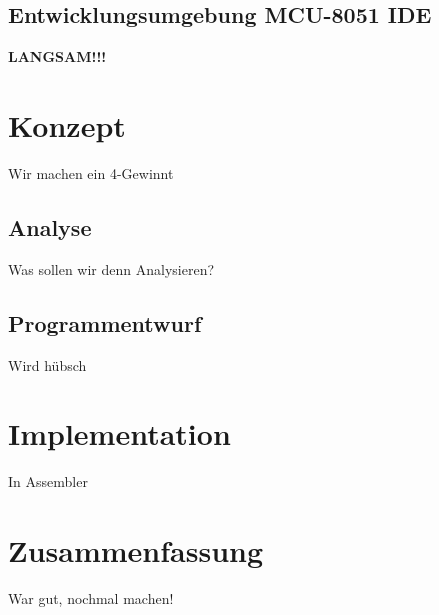 \section{Entwicklungsumgebung MCU-8051 IDE}

\textbf{LANGSAM!!!}

\chapter{Konzept}

Wir machen ein 4-Gewinnt

\section{Analyse}

Was sollen wir denn Analysieren?


\section{Programmentwurf}

Wird hübsch

\chapter{Implementation}

In Assembler

\chapter{Zusammenfassung}

War gut, nochmal machen!


